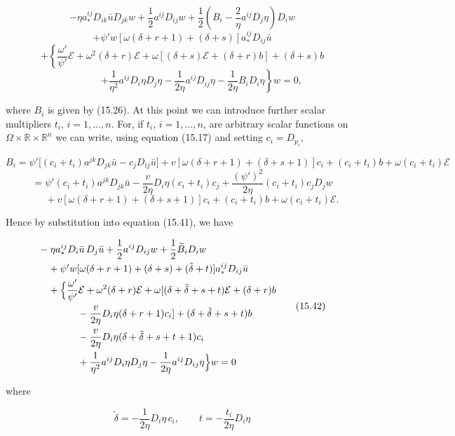 \[
-\eta a_{*}^{ij}D_{ik}\bar{u}D_{jk}w+\frac{1}{2}a^{ij}D_{ij}w+\frac{1}{2}\left(B_{i}-\frac{2}{\eta}a^{ij}D_{j}\eta\right)D_{i}w
\]
\[
+\psi' w[\omega(\delta+r+1)+(\delta+s)]a_{*}^{ij}D_{ij}\bar{u}
\]
\[
+\left\{\frac{\omega'}{\psi'}\mathscr{E}+\omega^{2}(\delta+r)\mathscr{E}+\omega[(\delta+s)\mathscr{E}+(\delta+r)b]+(\delta+s)b\right.
\]
\[
\qquad\qquad\left.+\frac{1}{\eta^{2}}a^{ij}D_{i}\eta D_{j}\eta-\frac{1}{2\eta}a^{ij}D_{ij}\eta-\frac{1}{2\eta}B_{i}D_{i}\eta\right\}w=0,
\]

where $B_{i}$ is given by (15.26). At this point we can introduce further scalar multipliers $t_{i}$, $i=1,\ldots,n$. For, if $t_{i}$, $i=1,\ldots,n$, are arbitrary scalar functions on $\Omega \times \mathbb{R} \times \mathbb{R}^{n}$ we can write, using equation (15.17) and setting $c_{i}=D_{p_{i}},$


\[
B_i=\psi'\bigl[(c_i+t_i)a^{jk}D_{jk}\bar u-c_jD_{ij}\bar u\bigr]
   +v[\omega(\delta+r+1)+(\delta+s+1)]c_i
   +(c_i+t_i)b+\omega(c_i+t_i)\mathcal E
\]
\[
=\psi'(c_i+t_i)a^{jk}D_{jk}\bar u-\frac{v}{2\eta}D_i\eta(c_i+t_i)c_j
  +\frac{(\psi')^2}{2\eta}(c_i+t_i)c_jD_jw
\]
\[
\qquad +v[\omega(\delta+r+1)+(\delta+s+1)]c_i+(c_i+t_i)b+\omega(c_i+t_i)\mathcal E.
\]

Hence by substitution into equation (15.41), we have

\begin{equation}
\begin{aligned}
&-\eta a_*^{ij}D_i\bar u\,D_j\bar u+\frac12 a^{ij}D_{ij}w+\frac12 \widetilde B_iD_iw\\
&\quad +\psi'w[\omega(\delta+r+1)+(\delta+s)+(\tilde\delta+t)]a_*^{ij}D_{ij}\bar u\\
&\quad +\Bigl\{\frac{\omega'}{\psi'}\mathcal E+\omega^2(\delta+r)\mathcal E+\omega[(\delta+\tilde\delta+s+t)\mathcal E+(\delta+r)b\\
&\qquad\qquad -\frac{v}{2\eta}D_i\eta(\delta+r+1)c_i]+(\delta+\tilde\delta+s+t)b\\
&\qquad\qquad -\frac{v}{2\eta}D_i\eta(\delta+\tilde\delta+s+t+1)c_i\\
&\qquad\qquad +\frac{1}{\eta^2}a^{ij}D_i\eta D_j\eta-\frac{1}{2\eta}a^{ij}D_{ij}\eta\Bigr\}w=0
\end{aligned}
\tag{15.42}
\end{equation}

where

\begin{equation}
\tilde\delta=-\frac{1}{2\eta}D_i\eta\,c_i,
\qquad
t=-\frac{t_i}{2\eta}D_i\eta
\tag{15.43}
\end{equation}

